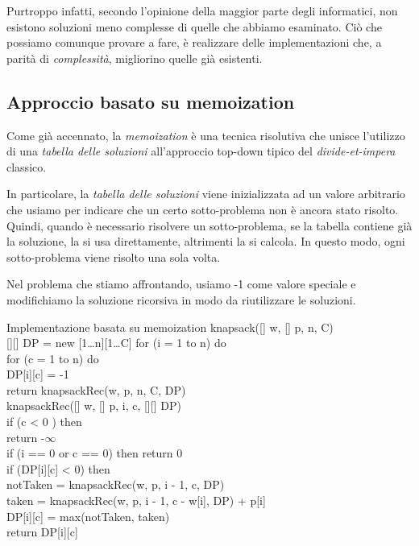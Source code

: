 Purtroppo infatti, secondo l'opinione della maggior parte degli informatici,
non esistono soluzioni meno complesse di quelle che abbiamo esaminato. Ciò
che possiamo comunque provare a fare, è realizzare delle implementazioni che,
a parità di \emph{complessità}, migliorino quelle già esistenti.

\subsection{Approccio basato su memoization}
Come già accennato, la \emph{memoization} è una tecnica risolutiva che unisce
l'utilizzo di una \emph{tabella delle soluzioni} all'approccio top-down tipico
del \emph{divide-et-impera} classico.

In particolare, la \emph{tabella delle soluzioni} viene inizializzata ad un
valore arbitrario che usiamo per indicare che un certo sotto-problema non è
ancora stato risolto. Quindi, quando è necessario risolvere un sotto-problema,
se la tabella contiene già la soluzione, la si usa direttamente, altrimenti la
si calcola. In questo modo, ogni sotto-problema viene risolto una sola volta.

\bigskip\noindent Nel problema che stiamo affrontando, usiamo -1 come valore
speciale e modifichiamo la soluzione ricorsiva in modo da riutilizzare le
soluzioni.

\begin{minicode}{Implementazione basata su memoization}
\ind{} knapsack([] w, [] p,  n,  C)\\
    [][] DP = new [1\dots n][1\dots C]\hfill{}
    \indf for (i = 1 to n) do\\
        \indff for (c = 1 to n) do\\
            DP[i][c] = -1\\
    \indf return knapsackRec(w, p, n, C, DP)\\

\ind{} knapsackRec([] w, [] p,  i,  c,
[][] DP)\\
    \indf if (c < 0 ) then\\
        return -$\infty$\\
    \indf if (i == 0 or c == 0) then
        return 0\\
    \indf if (DP[i][c] < 0) then\\
         notTaken = knapsackRec(w, p, i - 1, c, DP)\\
         taken = knapsackRec(w, p, i - 1, c - w[i], DP) + p[i]\\
        DP[i][c] = max(notTaken, taken)\\
    \indf return DP[i][c]
\end{minicode}

